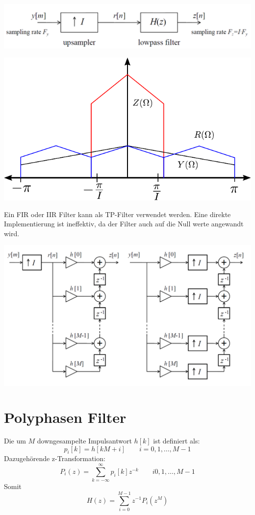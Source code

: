 \begin{center}
	\includegraphics[scale=.7]{./images/interpolation}
\end{center}
\begin{center}
	\includegraphics[scale=.7]{./images/interpolation_frequenz}
\end{center}
Ein FIR oder IIR Filter kann als TP-Filter verwendet werden. Eine direkte
Implementierung ist ineffektiv, da der Filter auch auf die Null werte angewandt
wird.
\begin{center}
	\includegraphics[scale=.7]{./images/interpolation_scheme}
\end{center}

\section{Polyphasen Filter}
Die um $M$ downgesampelte Impulsantwort $h[k]$ ist definiert als:
\[ p_i[k] = h[kM+i] \qquad i=0,1,\ldots,M-1 \]
Dazugehörende z-Transformation:
\[ P_i(z) = \sum_{k=-\infty}^{\infty} p_i[k]z^{-k} \qquad i0,1,\ldots,M-1 \]
Somit
\[ H(z) = \sum_{i=0}^{M-1}z^{-1} P_i(z^M) \]

